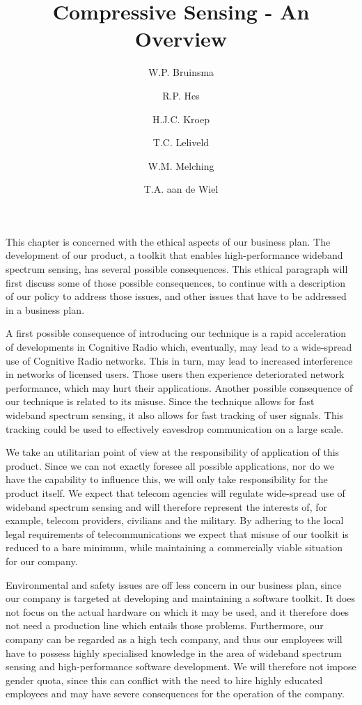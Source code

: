 \documentclass[a4paper, openany, oneside]{memoir}
\title{Compressive Sensing - An Overview}
\author{W.P. Bruinsma \and R.P. Hes \and H.J.C. Kroep \and T.C. Leliveld \and W.M. Melching \and T.A. aan de Wiel}
\begin{document}
This chapter is concerned with the ethical aspects of our business plan. The development of our product, a toolkit that enables high-performance wideband spectrum sensing, has several possible consequences. This ethical paragraph will first discuss some of those possible consequences, to continue with a description of our policy to address  those issues, and other issues that have to be addressed in a business plan. 

A first possible consequence of introducing our technique is a rapid acceleration of developments in Cognitive Radio which, eventually,
may lead to a wide-spread use of Cognitive Radio networks. This in turn, may lead to increased interference in networks of licensed users. Those users then experience deteriorated network performance, which may hurt their applications. Another possible consequence of our technique is related to its misuse. Since the technique allows for fast wideband spectrum sensing, it also allows for fast tracking of user signals. This tracking could be used to effectively eavesdrop communication on a large scale.

We take an utilitarian point of view at the responsibility of application of this product. Since we can not exactly foresee all possible applications, nor do we have the capability to influence this, we will only take responsibility for the product itself. We expect that telecom agencies will regulate wide-spread use of wideband spectrum sensing and will therefore represent the interests of, for example, telecom providers, civilians and the military. By adhering to the local legal requirements of telecommunications we expect that misuse of our toolkit is reduced to a bare minimum, while maintaining a commercially viable situation for our company.

Environmental and safety issues are off less concern in our business plan, since our company is targeted at developing and maintaining a software toolkit. It does not focus on the actual hardware on which it may be used, and it therefore does not need a production line which entails those problems. Furthermore, our company can be regarded as a high tech company, and thus our employees will have to possess highly specialised knowledge in the area of wideband spectrum sensing and high-performance software development. We will therefore not impose gender quota, since this can conflict with the need to hire highly educated employees and may have severe consequences for the operation of the company. 
\end{document}
